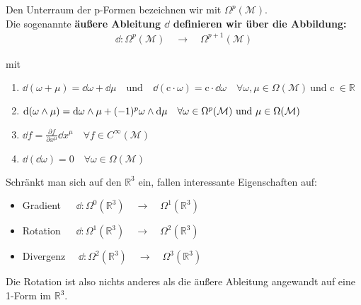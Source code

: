 Den Unterraum der p-Formen bezeichnen wir mit $\Omega^p(\mathcal{M})$. \\
Die sogenannte \bfseries äußere Ableitung $\dd$ \normalfont definieren wir über die Abbildung:
\begin{align*}
\dd: \Omega^p(\mathcal{M}) \quad \rightarrow \quad  \Omega^{p+1}(\mathcal{M})
\end{align*}
\begin{center}
mit
\end{center}
\begin{enumerate}
\item $\dd(\omega + \mu) = \dd\omega + \dd\mu \quad \text{und} \quad \dd(\text{c}\cdot\omega) = \text{c}\cdot\dd\omega \quad \forall \omega, \mu \in \Omega(\mathcal{M}) \ \text{und c} \ \in \mathbb{R} $
\item $\dd(\omega \wedge \mu) = \dd \omega \wedge \mu + (-1)^p \omega \wedge \dd\mu \quad \forall \omega \in \Omega^p(\mathcal{M}) \ \text{und} \ \mu \in \Omega(\mathcal{M})$
\item $\dd f = \frac{\partial f}{\partial x^{\mu}}\dd x^{\mu} \quad \forall f \in C^{\infty}(\mathcal{M})$
\item $\dd(\dd \omega) = 0 \quad \forall \omega \in \Omega(\mathcal{M}) $
\end{enumerate}
\flushleft
Schränkt man sich auf den $\mathbb{R}^3$ ein, fallen interessante Eigenschaften auf:
\begin{itemize}
\bfseries
\item Gradient $\quad \ \dd: \Omega^0(\mathbb{R}^3) \quad \rightarrow \quad  \Omega^1(\mathbb{R}^3)$
\item Rotation $\quad \ \dd: \Omega^1(\mathbb{R}^3) \quad \rightarrow \quad  \Omega^2(\mathbb{R}^3)$
\item Divergenz $\quad \dd: \Omega^2(\mathbb{R}^3) \quad \rightarrow \quad  \Omega^3(\mathbb{R}^3)$
\end{itemize}
\normalfont
Die Rotation ist also nichts anderes als die äußere Ableitung angewandt auf eine 1-Form im $\mathbb{R}^3.$
